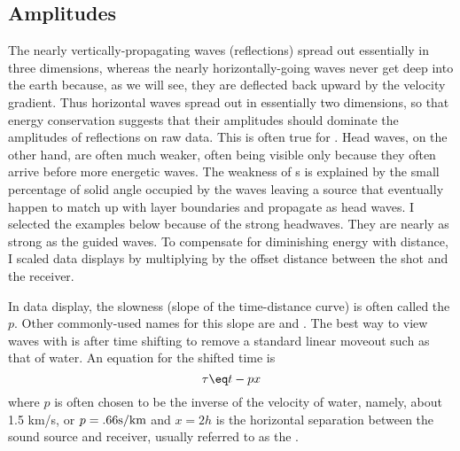 \subsection{Amplitudes}
\par
The nearly vertically-propagating waves (reflections)
spread out essentially in three dimensions,
whereas the nearly horizontally-going waves
never get deep into the earth because,
as we will see,
they are deflected back upward by the velocity gradient.
Thus horizontal waves spread out in essentially two dimensions,
so that energy conservation suggests
that their amplitudes should dominate the amplitudes of reflections
on raw data.
This is often true for .
Head waves, on the other hand,
are often much weaker, often being visible only because
they often arrive before more energetic waves.
The weakness of s
is explained by
the small percentage of solid angle occupied by the waves leaving a source
that eventually happen to match up with layer boundaries and propagate as
head waves.
I %
selected the examples below because of the strong headwaves.
They are nearly as strong as the guided waves.
To compensate for diminishing energy with distance,
I scaled data displays by multiplying by the offset distance
between the shot and the receiver.
\par
In data display, the slowness (slope of the time-distance curve)
is often called the   $p$.  Other commonly-used names for
this slope are  and .
The best way to view waves with 
is after time shifting to remove a standard linear moveout
such as that of water.
An equation for the shifted time is
\begin{equation}
\tau \eq t - p x
\label{eqn:lmo}
\end{equation}
where $p$ is often chosen to be the inverse of the velocity of water,
namely, about 1.5 km/s, or $p=.66 {\rm s/km}$
and $x=2h$ is the horizontal separation between
the sound source and receiver, usually referred to as the .

